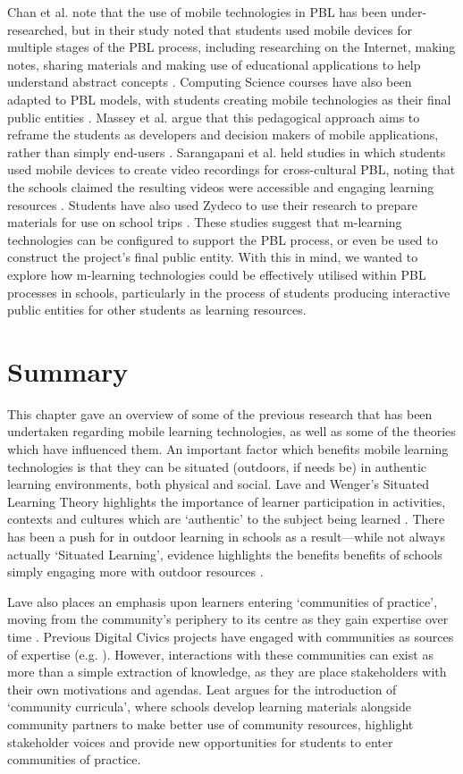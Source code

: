 Chan et al. note that the use of mobile technologies in PBL has been under-researched, but in their study noted that students used mobile devices for multiple stages of the PBL process, including researching on the Internet, making notes, sharing materials and making use of educational applications to help understand abstract concepts \citep{Chan2015}. Computing Science courses have also been adapted to PBL models, with students creating mobile technologies as their final public entities \citep{Massey2006, Rahman2018}. Massey et al. argue that this pedagogical approach aims to reframe the students as developers and decision makers of mobile applications, rather than simply end-users \citep{Massey2006}. Sarangapani et al. held studies in which students used mobile devices to create video recordings for cross-cultural PBL, noting that the schools claimed the resulting videos were accessible and engaging learning resources \citep{Sarangapani2016}. Students have also used Zydeco to use their research to prepare materials for use on school trips \citep{}. These studies suggest that m-learning technologies can be configured to support the PBL process, or even be used to construct the project's final public entity. With this in mind, we wanted to explore how m-learning technologies could be effectively utilised within PBL processes in schools, particularly in the process of students producing interactive public entities for other students as learning resources.

\section{Summary}
This chapter gave an overview of some of the previous research that has been undertaken regarding mobile learning technologies, as well as some of the theories which have influenced them.
An important factor which benefits mobile learning technologies is that they can be situated (outdoors, if needs be) in authentic learning environments, both physical and social. Lave and Wenger's Situated Learning Theory highlights the importance of learner participation in activities, contexts and cultures which are `authentic' to the subject being learned \citep{lave1991situated}. There has been a push for in outdoor learning in schools as a result---while not always actually `Situated Learning', evidence highlights the benefits benefits of schools simply engaging more with outdoor resources \citep{Fiennes2015}.

Lave also places an emphasis upon learners entering `communities of practice', moving from the community's periphery to its centre as they gain expertise over time \citep{Lave1991}. Previous Digital Civics projects have engaged with communities as sources of expertise (e.g. \citep{Dodds2017, Rainey2019}). However, interactions with these communities can exist as more than a simple extraction of knowledge, as they are place stakeholders with their own motivations and agendas. Leat argues for the introduction of `community curricula', where schools develop learning materials alongside community partners to make better use of community resources, highlight stakeholder voices and provide new opportunities for students to enter communities of practice.

